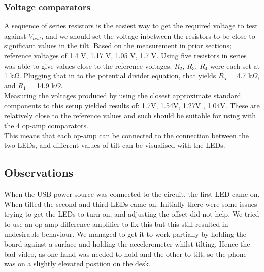 \documentclass[12pt]{article}
\begin{document}
            \subsubsection{Voltage comparators}
            A sequence of series resistors is the easiest way to get the required voltage to test against $V_{test}$, and we should set the voltage inbetween the resistors
            to be close to significant values in the tilt. Based on the measurement in prior sections; reference voltages of 1.4 V, 1.17 V, 1.05 V, 1.7 V.
            Using five resistors in series was able to give values close to the reference voltages. $R_2$, $R_3$, $R_4$ were each set at 1 k$\Omega$. Plugging that in to the
            potential divider equation, that yields $R_5$ = 4.7 k$\Omega$, and $R_1$ = 14.9 k$\Omega$. \\
            Measuring the voltages produced by using the closest approximate standard components to this setup yielded results of: 1.7V, 1.54V, 1.27V , 1.04V. These are relatively
            close to the reference values and such should be suitable for using with the 4 op-amp comparators. \\
            This means that each op-amp can be connected to the connection between the two LEDs, and different values of tilt can be visualised with the LEDs.
    \subsection{Observations}
            When the USB power source was connected to the circuit, the first LED came on. When tilted the second and third LEDs came on. Initially there were some
            issues trying to get the LEDs to turn on, and adjusting the offset did not help. We tried to use an op-amp difference amplifier to fix this but this
            still resulted in undesirable behaviour. We managed to get it to work partially by holding the board against a surface and holding the accelerometer whilst tilting.
            Hence the bad video, as one hand was needed to hold and the other to tilt, so the phone was on a slightly elevated postiion on the desk. 
\end{document}
